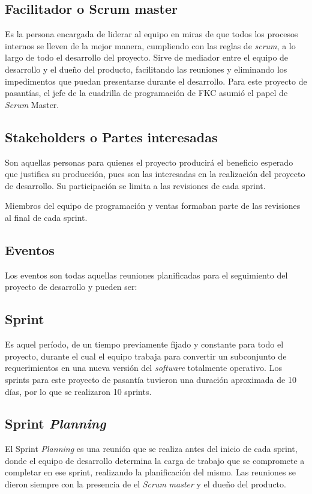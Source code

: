 \subsection{Facilitador o Scrum master}
Es la persona encargada de liderar al equipo en miras de que todos los procesos internos se lleven de la mejor manera, cumpliendo con las reglas de \emph{scrum}, a lo largo de todo el desarrollo del proyecto. Sirve de mediador entre el equipo de desarrollo y el dueño del producto, facilitando las reuniones y eliminando los impedimentos que puedan presentarse durante el desarrollo.
Para este proyecto de pasantías, el jefe de la cuadrilla de programación de \gls{FKC} asumió el papel de \emph{Scrum} Master.

\subsection{Stakeholders o Partes interesadas}
Son aquellas personas para quienes el proyecto producirá el beneficio esperado que justifica su producción, pues son las interesadas en la realización del proyecto de desarrollo. Su participación se limita a las revisiones de cada sprint.

Miembros del equipo de programación y ventas formaban parte de las revisiones al final de cada sprint.

\subsection{Eventos}
Los eventos son todas aquellas reuniones planificadas para el seguimiento del proyecto de desarrollo y pueden ser:

\subsection{Sprint}
Es aquel período, de un tiempo previamente fijado y constante para todo el proyecto, durante el cual el equipo trabaja para convertir un subconjunto de requerimientos en una nueva versión del \emph{software} totalmente operativo. Los sprints para este proyecto de pasantía tuvieron una duración aproximada de 10 días, por lo que se realizaron 10 sprints.

\subsection{Sprint \emph{Planning}}
El Sprint \emph{Planning} es una reunión que se realiza antes del inicio de cada sprint, donde el equipo de desarrollo determina la carga de trabajo que se compromete a completar en ese sprint, realizando la planificación del mismo. Las reuniones se dieron siempre con la presencia de el \emph{Scrum} \emph{master} y el dueño del producto.

